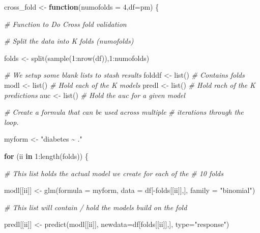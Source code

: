 \documentclass[
]{article}
\newenvironment{Shaded}{\begin{snugshade}}{\end{snugshade}}
\newcommand{\AttributeTok}[1]{\textcolor[rgb]{0.77,0.63,0.00}{#1}}
\newcommand{\CommentTok}[1]{\textcolor[rgb]{0.56,0.35,0.01}{\textit{#1}}}
\newcommand{\ControlFlowTok}[1]{\textcolor[rgb]{0.13,0.29,0.53}{\textbf{#1}}}
\newcommand{\DecValTok}[1]{\textcolor[rgb]{0.00,0.00,0.81}{#1}}
\newcommand{\FunctionTok}[1]{\textcolor[rgb]{0.00,0.00,0.00}{#1}}
\newcommand{\NormalTok}[1]{#1}
\newcommand{\OtherTok}[1]{\textcolor[rgb]{0.56,0.35,0.01}{#1}}
\newcommand{\SpecialCharTok}[1]{\textcolor[rgb]{0.00,0.00,0.00}{#1}}
\newcommand{\StringTok}[1]{\textcolor[rgb]{0.31,0.60,0.02}{#1}}
\begin{document}
\begin{Shaded}
\begin{Highlighting}[]
\NormalTok{cross\_fold }\OtherTok{\textless{}{-}} \ControlFlowTok{function}\NormalTok{(}\AttributeTok{numofolds =} \DecValTok{4}\NormalTok{,}\AttributeTok{df=}\NormalTok{pm) \{}
  
  \CommentTok{\# Function to Do Cross fold validation}
  
  \CommentTok{\# Split the data into K folds (numofolds)}
  
\NormalTok{  folds }\OtherTok{\textless{}{-}} \FunctionTok{split}\NormalTok{(}\FunctionTok{sample}\NormalTok{(}\DecValTok{1}\SpecialCharTok{:}\FunctionTok{nrow}\NormalTok{(df)),}\DecValTok{1}\SpecialCharTok{:}\NormalTok{numofolds) }
  
  \CommentTok{\# We setup some blank lists to stash results}
\NormalTok{  folddf    }\OtherTok{\textless{}{-}} \FunctionTok{list}\NormalTok{()  }\CommentTok{\# Contains folds}
\NormalTok{  modl      }\OtherTok{\textless{}{-}} \FunctionTok{list}\NormalTok{()  }\CommentTok{\# Hold each of the K models}
\NormalTok{  predl     }\OtherTok{\textless{}{-}} \FunctionTok{list}\NormalTok{()  }\CommentTok{\# Hold rach of the K predictions}
\NormalTok{  auc       }\OtherTok{\textless{}{-}} \FunctionTok{list}\NormalTok{()  }\CommentTok{\# Hold the auc for a given model}
  
  \CommentTok{\# Create a formula that can be used across multiple}
  \CommentTok{\# iterations through the loop. }
  
\NormalTok{  myform }\OtherTok{\textless{}{-}} \StringTok{"diabetes \textasciitilde{} ."}
  
  \ControlFlowTok{for}\NormalTok{ (ii }\ControlFlowTok{in} \DecValTok{1}\SpecialCharTok{:}\FunctionTok{length}\NormalTok{(folds)) \{}
    
    \CommentTok{\# This list holds the actual model we create for each of the }
    \CommentTok{\# 10 folds}
    
\NormalTok{    modl[[ii]] }\OtherTok{\textless{}{-}} \FunctionTok{glm}\NormalTok{(}\AttributeTok{formula =}\NormalTok{ myform, }
                      \AttributeTok{data =}\NormalTok{ df[}\SpecialCharTok{{-}}\NormalTok{folds[[ii]],],}
                      \AttributeTok{family =} \StringTok{"binomial"}\NormalTok{)}

    
    \CommentTok{\# This list will contain / hold the models build on the fold}
    
\NormalTok{    predl[[ii]]  }\OtherTok{\textless{}{-}} \FunctionTok{predict}\NormalTok{(modl[[ii]],}
                            \AttributeTok{newdata=}\NormalTok{df[folds[[ii]],],}
                            \AttributeTok{type=}\StringTok{"response"}\NormalTok{)}
   

\end{Highlighting}
\end{Shaded}
\end{document}
